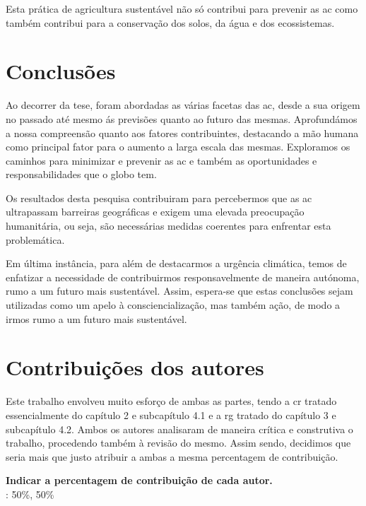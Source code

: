\documentclass{report}
\begin{document}
Esta prática de agricultura sustentável não só contribui para prevenir as \ac{ac} como também contribui para a conservação dos solos, da água e dos ecossistemas.

\chapter{Conclusões}
\label{chap.conclusao}
Ao decorrer da tese, foram abordadas as várias facetas das \ac{ac}, desde a sua origem no passado até mesmo ás previsões quanto ao futuro das mesmas.
Aprofundámos a nossa compreensão quanto aos fatores contribuintes, destacando a mão humana como principal fator para o aumento a larga escala das mesmas. Exploramos os caminhos para minimizar e prevenir as \ac{ac} e também as oportunidades e responsabilidades que o globo tem.

Os resultados desta pesquisa contribuiram para percebermos que as \ac{ac} ultrapassam barreiras geográficas e exigem uma elevada preocupação humanitária, ou seja, são necessárias medidas coerentes para enfrentar esta problemática.

Em última instância, para além de destacarmos a urgência climática, temos de enfatizar a necessidade de contribuirmos responsavelmente de maneira autónoma, rumo a um futuro mais sustentável. Assim, espera-se que estas conclusões sejam utilizadas como um apelo à consciencialização, mas também ação, de modo a irmos rumo a um futuro mais sustentável. 





\chapter*{Contribuições dos autores}
Este trabalho envolveu muito esforço de ambas as partes, tendo a \ac{cr} tratado essencialmente do capítulo 2 e subcapítulo 4.1 e a \ac{rg} tratado do capítulo 3 e subcapítulo 4.2.
Ambos os autores analisaram de maneira crítica e construtiva o trabalho, procedendo também à revisão do mesmo.
Assim sendo, decidimos que seria mais que justo atribuir a ambas a mesma percentagem de contribuição. 



\vspace{10pt}
\textbf{Indicar a percentagem de contribuição de cada autor.}\\

\autores : 50\%, 50\%\\
\end{document}
